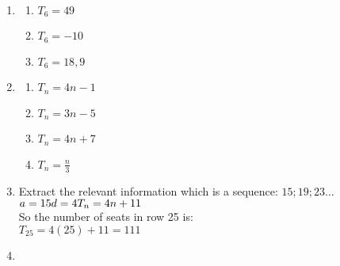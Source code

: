  \begin{eocsolutions}{}{
\begin{enumerate}[itemsep=5pt, label=\textbf{\arabic*}. ] 
 \item \begin{multicols}{2}



  \begin{enumerate}[noitemsep, label=\textbf{(\alph*)} ]
  \item $T_6 = 49$
  \item $T_6 = -10$
  \item $T_6 = 18,9$
  \end{enumerate}
\end{multicols}
\item \begin{multicols}{2}
  \begin{enumerate}[noitemsep, label=\textbf{(\alph*)} ]
\item 
$T_n = 4n - 1$ 
  \item 
$T_n = 3n -5$ 
  \item 
$T_n = 4n + 7 $ 
  \item 
$T_n = \frac{n}{3} $ 
  \end{enumerate}
\end{multicols}
\item Extract the relevant information which is a sequence: $15; 19 ; 23 \ldots$\\
$a = 15\\
d = 4\\
T_n = 4n + 11 $ \\
So the number of seats in row 25 is:\\
$T_{25} = 4(25) + 11 = 111$ 
\item 
  \begin{enumerate}[noitemsep, label=\textbf{(\alph*)} ]

\end{enumerate}
\end{enumerate}}
\end{eocsolutions}
